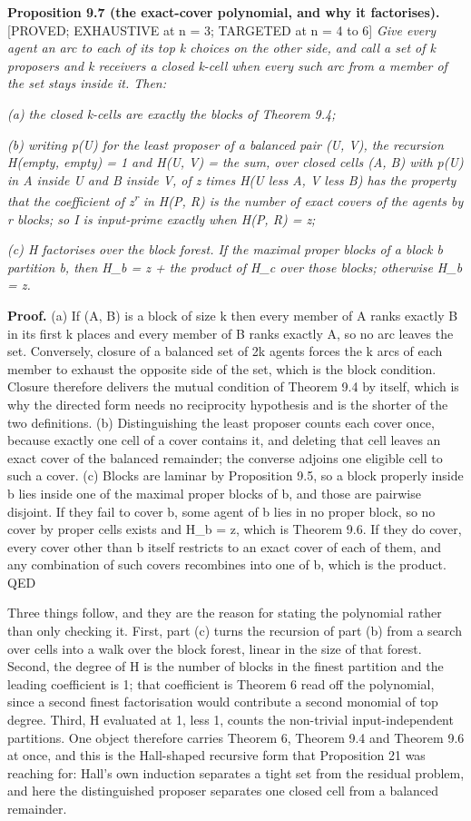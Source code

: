 \documentclass[
  11pt,
]{article}
\begin{document}
\textbf{Proposition 9.7 (the exact-cover polynomial, and why it
factorises).} {[}PROVED; EXHAUSTIVE at n = 3; TARGETED at n = 4 to 6{]}
\emph{Give every agent an arc to each of its top k choices on the other
side, and call a set of k proposers and k receivers a closed k-cell when
every such arc from a member of the set stays inside it. Then:}

\emph{(a) the closed k-cells are exactly the blocks of Theorem 9.4;}

\emph{(b) writing p(U) for the least proposer of a balanced pair (U, V),
the recursion H(empty, empty) = 1 and H(U, V) = the sum, over closed
cells (A, B) with p(U) in A inside U and B inside V, of z times H(U less
A, V less B) has the property that the coefficient of
z\textsuperscript{r} in H(P, R) is the number of exact covers of the
agents by r blocks; so I is input-prime exactly when H(P, R) = z;}

\emph{(c) H factorises over the block forest. If the maximal proper
blocks of a block b partition b, then H\_b = z + the product of H\_c
over those blocks; otherwise H\_b = z.}

\textbf{Proof.} (a) If (A, B) is a block of size k then every member of
A ranks exactly B in its first k places and every member of B ranks
exactly A, so no arc leaves the set. Conversely, closure of a balanced
set of 2k agents forces the k arcs of each member to exhaust the
opposite side of the set, which is the block condition. Closure
therefore delivers the mutual condition of Theorem 9.4 by itself, which
is why the directed form needs no reciprocity hypothesis and is the
shorter of the two definitions. (b) Distinguishing the least proposer
counts each cover once, because exactly one cell of a cover contains it,
and deleting that cell leaves an exact cover of the balanced remainder;
the converse adjoins one eligible cell to such a cover. (c) Blocks are
laminar by Proposition 9.5, so a block properly inside b lies inside one
of the maximal proper blocks of b, and those are pairwise disjoint. If
they fail to cover b, some agent of b lies in no proper block, so no
cover by proper cells exists and H\_b = z, which is Theorem 9.6. If they
do cover, every cover other than b itself restricts to an exact cover of
each of them, and any combination of such covers recombines into one of
b, which is the product. QED

Three things follow, and they are the reason for stating the polynomial
rather than only checking it. First, part (c) turns the recursion of
part (b) from a search over cells into a walk over the block forest,
linear in the size of that forest. Second, the degree of H is the number
of blocks in the finest partition and the leading coefficient is 1; that
coefficient is Theorem 6 read off the polynomial, since a second finest
factorisation would contribute a second monomial of top degree. Third, H
evaluated at 1, less 1, counts the non-trivial input-independent
partitions. One object therefore carries Theorem 6, Theorem 9.4 and
Theorem 9.6 at once, and this is the Hall-shaped recursive form that
Proposition 21 was reaching for: Hall's own induction separates a tight
set from the residual problem, and here the distinguished proposer
separates one closed cell from a balanced remainder.
\end{document}
